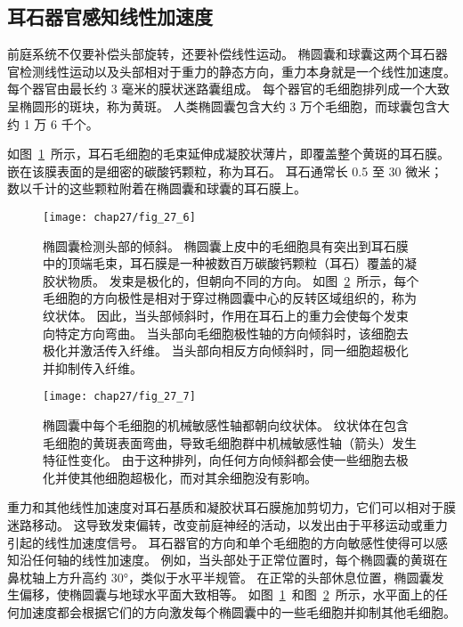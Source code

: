\subsection{耳石器官感知线性加速度}

前庭系统不仅要补偿头部旋转，还要补偿线性运动。
椭圆囊和球囊这两个耳石器官检测线性运动以及头部相对于重力的静态方向，重力本身就是一个线性加速度。
每个器官由最长约 3 毫米的膜状迷路囊组成。
每个器官的毛细胞排列成一个大致呈椭圆形的斑块，称为黄斑。
人类椭圆囊包含大约 3 万个毛细胞，而球囊包含大约 1 万 6 千个。


如图~\ref{fig:27_6}~所示，耳石毛细胞的毛束延伸成凝胶状薄片，即覆盖整个黄斑的耳石膜。
嵌在该膜表面的是细密的碳酸钙颗粒，称为耳石。
耳石通常长 0.5 至 30 微米；
数以千计的这些颗粒附着在椭圆囊和球囊的耳石膜上。


\begin{figure}[htbp]
	\centering
	\texttt{[image: chap27/fig\_27\_6]}
	\caption{椭圆囊检测头部的倾斜。
		椭圆囊上皮中的毛细胞具有突出到耳石膜中的顶端毛束，耳石膜是一种被数百万碳酸钙颗粒（耳石）覆盖的凝胶状物质。
		发束是极化的，但朝向不同的方向。
		如图~\ref{fig:27_7}~所示，每个毛细胞的方向极性是相对于穿过椭圆囊中心的反转区域组织的，称为纹状体。
		因此，当头部倾斜时，作用在耳石上的重力会使每个发束向特定方向弯曲。
		当头部向毛细胞极性轴的方向倾斜时，该细胞去极化并激活传入纤维。
		当头部向相反方向倾斜时，同一细胞超极化并抑制传入纤维\cite{iurato2013submicroscopic}。}
	\label{fig:27_6}
\end{figure}


\begin{figure}[htbp]
	\centering
	\texttt{[image: chap27/fig\_27\_7]}
	\caption{椭圆囊中每个毛细胞的机械敏感性轴都朝向纹状体。
		纹状体在包含毛细胞的黄斑表面弯曲，导致毛细胞群中机械敏感性轴（箭头）发生特征性变化。
		由于这种排列，向任何方向倾斜都会使一些细胞去极化并使其他细胞超极化，而对其余细胞没有影响\cite{spoendlin2016ultrastructure}。}
	\label{fig:27_7}
\end{figure}


重力和其他线性加速度对耳石基质和凝胶状耳石膜施加剪切力，它们可以相对于膜迷路移动。
这导致发束偏转，改变前庭神经的活动，以发出由于平移运动或重力引起的线性加速度信号。
耳石器官的方向和单个毛细胞的方向敏感性使得可以感知沿任何轴的线性加速度。
例如，当头部处于正常位置时，每个椭圆囊的黄斑在鼻枕轴上方升高约 30°，类似于水平半规管。
在正常的头部休息位置，椭圆囊发生偏移，使椭圆囊与地球水平面大致相等。
如图~\ref{fig:27_6}~和图~\ref{fig:27_7}~所示，水平面上的任何加速度都会根据它们的方向激发每个椭圆囊中的一些毛细胞并抑制其他毛细胞。


